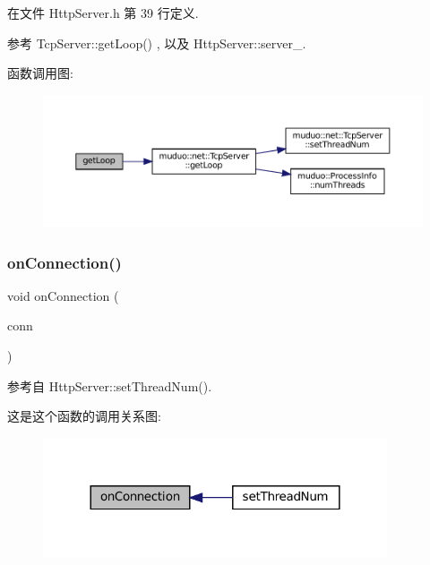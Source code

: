 在文件 Http\+Server.\+h 第 39 行定义.



参考 Tcp\+Server\+::get\+Loop() , 以及 Http\+Server\+::server\+\_\+.

函数调用图\+:
\nopagebreak
\begin{figure}[H]
\begin{center}
\leavevmode
\includegraphics[width=350pt]{classmuduo_1_1net_1_1HttpServer_aef1cbfe0592e8196e6c81b4db82a39ce_cgraph}
\end{center}
\end{figure}
\mbox{\label{classmuduo_1_1net_1_1HttpServer_ae085355191b9979cba83ee65fb969fcb}} 
\subsubsection{\texorpdfstring{on\+Connection()}{onConnection()}}
{\footnotesize\ttfamily void on\+Connection (\begin{DoxyParamCaption}\item[{const \hyperlink{namespacemuduo_1_1net_ab91a46e9290926aa692450e46cfc9039}{Tcp\+Connection\+Ptr} \&}]{conn }\end{DoxyParamCaption})\hspace{0.3cm}{\ttfamily [private]}}



参考自 Http\+Server\+::set\+Thread\+Num().

这是这个函数的调用关系图\+:
\nopagebreak
\begin{figure}[H]
\begin{center}
\leavevmode
\includegraphics[width=288pt]{classmuduo_1_1net_1_1HttpServer_ae085355191b9979cba83ee65fb969fcb_icgraph}
\end{center}
\end{figure}
\mbox{\label{classmuduo_1_1net_1_1HttpServer_affde82cb1aeae31f8ce39103fa4cd358}} 

